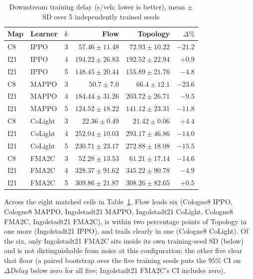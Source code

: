 \documentclass[journal]{IEEEtran}
\theoremstyle{definition}
\begin{document}
\begin{table}[t]
    \centering
    \caption{Downstream training delay (s/veh; lower is better), mean $\pm$ SD over 5 independently trained seeds}
    \label{tab:wait-gains}
    \scriptsize
    \setlength{\tabcolsep}{2.5pt}

    \begin{tabular}{llrrrr}
        \toprule
        Map & Learner & $k$ & Flow                      & Topology                  & $\Delta\%$ \\
        \midrule
        C8  & IPPO    & 3   & $\mathbf{57.46\pm11.48}$  & $72.93\pm10.22$           & $-21.2$    \\
        I21 & IPPO    & 4   & $194.22\pm26.83$          & $\mathbf{192.52\pm22.94}$ & $+0.9$     \\
        I21 & IPPO    & 5   & $\mathbf{148.45\pm20.44}$ & $155.89\pm21.76$          & $-4.8$     \\
        \addlinespace
        C8  & MAPPO   & 3   & $\mathbf{50.7\pm7.0}$     & $66.4\pm12.1$             & $-23.6$    \\
        I21 & MAPPO   & 4   & $\mathbf{184.44\pm31.26}$ & $203.72\pm26.71$          & $-9.5$     \\
        I21 & MAPPO   & 5   & $\mathbf{124.52\pm18.22}$ & $141.12\pm23.31$          & $-11.8$    \\
        \addlinespace
        C8  & CoLight & 3   & $22.36\pm0.49$            & $\mathbf{21.42\pm0.06}$   & $+4.4$     \\
        I21 & CoLight & 4   & $\mathbf{252.04\pm10.03}$ & $293.17\pm46.86$          & $-14.0$    \\
        I21 & CoLight & 5   & $\mathbf{230.71\pm23.17}$ & $272.88\pm18.08$          & $-15.5$    \\
        \addlinespace
        C8  & FMA2C   & 3   & $\mathbf{52.28\pm13.53}$  & $61.21\pm17.14$           & $-14.6$    \\
        I21 & FMA2C   & 4   & $\mathbf{328.37\pm91.62}$ & $345.22\pm90.78$          & $-4.9$     \\
        I21 & FMA2C   & 5   & $309.86\pm21.87$          & $\mathbf{308.26\pm82.65}$ & $+0.5$     \\
        \bottomrule
    \end{tabular}
\end{table}

Across the eight matched cells in Table~\ref{tab:wait-gains}, Flow leads six (Cologne8 IPPO, Cologne8 MAPPO, Ingolstadt21 MAPPO, Ingolstadt21 CoLight, Cologne8 FMA2C, Ingolstadt21 FMA2C), is within two percentage points of Topology in one more (Ingolstadt21 IPPO), and trails clearly in one (Cologne8 CoLight). Of the six, only Ingolstadt21 FMA2C sits inside its own training-seed SD (below) and is not distinguishable from noise at this configuration; the other five clear that floor (a paired bootstrap over the five training seeds puts the $95\%$ CI on $\Delta Delay$ below zero for all five; Ingolstadt21 FMA2C's CI includes zero).
\end{document}
